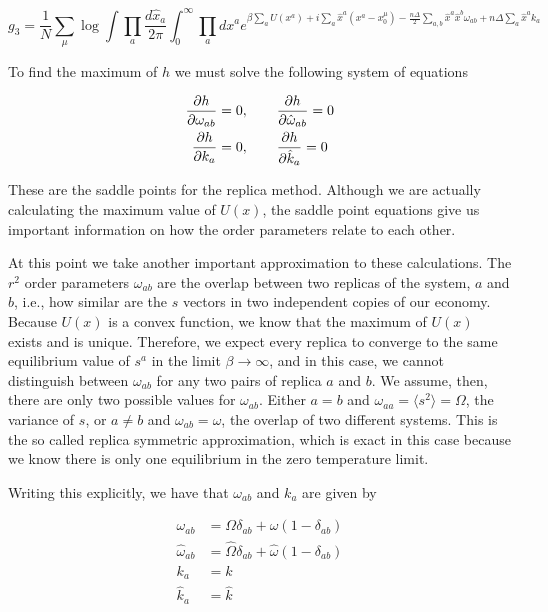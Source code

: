 \begin{equation}
  \label{eq:a_42}
  g_3 = \frac{1}{N} \sum_\mu \log \int \prod_a \frac{d\hat{x}_a}{2\pi}
  \int_0^\infty \prod_a dx^a e^{\beta \sum_a U(x^a) + i \sum_a
    \hat{x}^a(x^a-x_0^\mu) - \frac{n\Delta}{2} \sum_{a,b} \hat{x}^a
    \hat{x}^b \omega_{ab} + n\Delta \sum_a \hat{x}^a k_a }
\end{equation}

To find the maximum of $h$ we must solve the following system of equations

\begin{align}
  \label{eq:a_43}
  \frac{\partial h}{\partial \omega_{ab}}& = 0, \quad \quad \frac{\partial h}{\partial
    \hat{\omega}_{ab}} = 0 \nonumber \\     \frac{\partial h}{\partial
    k_{a}}& = 0, \quad \quad  \frac{\partial h}{\partial \hat{k}_a}= 0 
\end{align}

These are the saddle points for the replica method. Although we are actually calculating the maximum value of $U(x)$, the saddle point equations give us important information on how the order parameters relate to each other.

At this point we take another important approximation to these calculations. The $r^2$ order parameters $\omega_{ab}$ are the overlap between two replicas of the system, $a$ and $b$, i.e., how similar are the $s$ vectors in two independent copies of our economy. Because $U(x)$ is a convex function, we know that the maximum of $U(x)$ exists and is unique. Therefore, we expect every replica to converge to the same equilibrium value of $s^a$ in the limit $\beta \to \infty$, and in this case, we cannot distinguish between $\omega_{ab}$ for any two pairs of replica $a$ and $b$. We assume, then, there are only two possible values for $\omega_{ab}$. Either $a = b$ and $\omega_{aa} = \langle s^2 \rangle = \Omega$, the variance of $s$, or $a \neq b$ and $\omega_{ab} = \omega$, the overlap of two different systems. This is the so called replica symmetric approximation, which is exact in this case because we know there is only one equilibrium in the zero temperature limit.

Writing this explicitly, we have that $\omega_{ab}$ and $k_a$ are given by

\begin{align}
  \label{eq:a_44}
  \omega_{ab} & = \Omega \delta_{ab} + \omega (1 - \delta_{ab})
  \nonumber \\
  \hat{\omega}_{ab} & = \hat{\Omega} \delta_{ab} + \hat{\omega}
  (1-\delta_{ab}) \nonumber \\
  k_a & = k \\
  \hat{k}_a & = \hat{k} \nonumber
\end{align}

